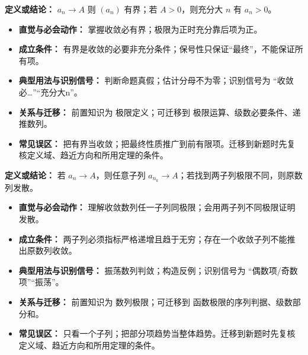\begin{knowledgeBox}
\textbf{定义或结论：} $a_n\to A$ 则 $(a_n)$ 有界；若 $A>0$，则充分大 $n$ 有 $a_n>0$。

\begin{itemize}
  \item \textbf{直觉与必会动作：} 掌握收敛必有界；极限为正时充分靠后项为正。
  \item \textbf{成立条件：} 有界是收敛的必要非充分条件；保号性只保证“最终”，不能保证所有项。
  \item \textbf{典型用法与识别信号：} 判断命题真假；估计分母不为零；识别信号为 “收敛必…”“充分大n”。
  \item \textbf{关系与迁移：} 前置知识为 极限定义；可迁移到 极限运算、级数必要条件、递推数列。
  \item \textbf{常见误区：} 把有界当收敛；把最终性质推广到前有限项。迁移到新题时先复核定义域、趋近方向和所用定理的条件。
\end{itemize}
\end{knowledgeBox}

\begin{knowledgeBox}
\textbf{定义或结论：} 若 $a_n\to A$，则任意子列 $a_{n_k}\to A$；若找到两子列极限不同，则原数列发散。

\begin{itemize}
  \item \textbf{直觉与必会动作：} 理解收敛数列任一子列同极限；会用两子列不同极限证明发散。
  \item \textbf{成立条件：} 两子列必须指标严格递增且趋于无穷；存在一个收敛子列不能推出原数列收敛。
  \item \textbf{典型用法与识别信号：} 振荡数列判敛；构造反例；识别信号为 “偶数项/奇数项”“振荡”。
  \item \textbf{关系与迁移：} 前置知识为 数列极限；可迁移到 函数极限的序列判据、级数部分和。
  \item \textbf{常见误区：} 只看一个子列；把部分项趋势当整体趋势。迁移到新题时先复核定义域、趋近方向和所用定理的条件。
\end{itemize}
\end{knowledgeBox}

